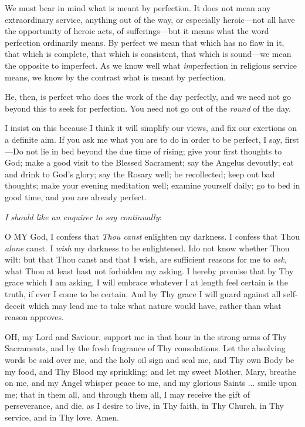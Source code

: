 We must bear in mind what is meant by perfection.
It does not mean any extraordinary service, anything out of the way, or
especially heroic—not all have the opportunity of heroic acts, of
sufferings—but it means what the word perfection ordinarily means. By
perfect we mean that which has no flaw in it, that which is complete,
that which is consistent, that which is sound—we mean the opposite to
imperfect. As we know well what \emph{im}perfection in religious
service means, we know by the contrast what is meant by perfection.

He, then, is perfect who does the work of the day
perfectly, and we need not go beyond this to seek for perfection. You
need not go out of the \emph{round} of the day.

I insist on this because I think it will simplify
our views, and fix our exertions on a definite aim. If you ask me what
you are to do in order to be perfect, I say, first—Do not lie in bed
beyond the due time of rising; give your first thoughts to God; make a
good visit to the Blessed Sacrament; say the Angelus devoutly; eat and
drink to God’s glory; say the Rosary well; be recollected; keep out
bad thoughts; make your evening meditation well; examine yourself daily;
go to bed in good time, and you are already perfect.


\emph{I should like an enquirer to say
continually}:

O MY God, I
confess that \emph{Thou canst} enlighten my darkness. I confess that
Thou \emph{alone} canst. I \emph{wish} my darkness to be enlightened. I\emph{}do not know whether Thou wilt: but that Thou canst and that I wish,
are sufficient reasons for me to \emph{ask}, what Thou at least hast not
forbidden my asking. I hereby promise that by Thy grace which I am
asking, I will embrace whatever I at length feel certain is the truth,
if ever I come to be certain. And by Thy grace I will guard against all
self-deceit which may lead me to take what nature would have, rather
than what reason approves.


OH, my Lord
and Saviour, support me in that hour in the strong arms of Thy
Sacraments, and by the fresh fragrance of Thy consolations. Let the
absolving words be said over me, and the holy oil sign and seal me, and
Thy own Body be my food, and Thy Blood my sprinkling; and let my sweet
Mother, Mary, breathe on me, and my Angel whisper peace to me, and my
glorious Saints ... smile upon me; that in them all, and through them
all, I may receive the gift of perseverance, and die, as I desire to
live, in Thy faith, in Thy Church, in Thy service, and in Thy love.
Amen.

